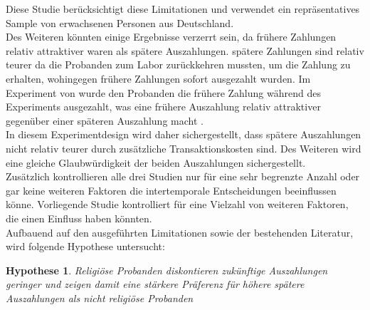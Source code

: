 \documentclass[11pt,a4paper]{article}
\newtheorem{hyp}{Hypothese}
\begin{document}
Diese Studie berücksichtigt diese Limitationen und verwendet ein repräsentatives Sample von erwachsenen Personen aus Deutschland.\\ 

Des Weiteren könnten einige Ergebnisse verzerrt sein, da frühere Zahlungen relativ attraktiver waren als spätere Auszahlungen. \textcite{carter2012religious}  spätere Zahlungen sind relativ teurer da die Probanden zum Labor zurückkehren mussten, um die Zahlung zu erhalten, wohingegen frühere Zahlungen sofort ausgezahlt wurden. Im Experiment von \textcite{benjamin2013religious} wurde den Probanden die frühere Zahlung während des Experiments ausgezahlt, was eine frühere Auszahlung relativ attraktiver gegenüber einer späteren Auszahlung macht \parencite{dohmen2012interpreting}.\\

 
In diesem Experimentdesign wird daher sichergestellt, dass spätere Auszahlungen nicht relativ teurer durch zusätzliche Transaktionskosten sind. Des Weiteren wird eine gleiche Glaubwürdigkeit der beiden Auszahlungen sichergestellt.\\

Zusätzlich kontrollieren alle drei Studien nur für eine sehr begrenzte Anzahl oder gar keine weiteren Faktoren die  intertemporale Entscheidungen beeinflussen könne.
Vorliegende Studie kontrolliert für eine Vielzahl von weiteren Faktoren, die einen Einfluss haben könnten.\\ 




Aufbauend auf den ausgeführten Limitationen sowie der bestehenden Literatur, wird folgende Hypothese untersucht:
\begin{hyp}
Religiöse Probanden diskontieren zukünftige Auszahlungen geringer und zeigen damit eine stärkere Präferenz für höhere spätere Auszahlungen als nicht religiöse Probanden 
\end{hyp}
\end{document}
